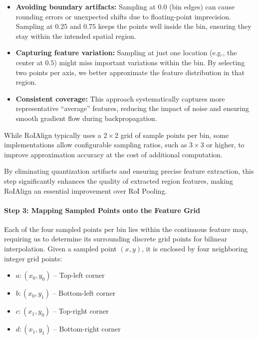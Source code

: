 \begin{itemize}
    \item \textbf{Avoiding boundary artifacts:} Sampling at \(0.0\) (bin edges) can cause rounding errors or unexpected shifts due to floating-point imprecision. Sampling at \(0.25\) and \(0.75\) keeps the points well inside the bin, ensuring they stay within the intended spatial region.
    
    \item \textbf{Capturing feature variation:} Sampling at just one location (e.g., the center at \(0.5\)) might miss important variations within the bin. By selecting two points per axis, we better approximate the feature distribution in that region.
    
    \item \textbf{Consistent coverage:} This approach systematically captures more representative “average” features, reducing the impact of noise and ensuring smooth gradient flow during backpropagation.
\end{itemize}

While RoIAlign typically uses a \(2 \times 2\) grid of sample points per bin, some implementations allow configurable sampling ratios, such as \(3 \times 3\) or higher, to improve approximation accuracy at the cost of additional computation.

By eliminating quantization artifacts and ensuring precise feature extraction, this step significantly enhances the quality of extracted region features, making RoIAlign an essential improvement over RoI Pooling.

\paragraph{Step 3: Mapping Sampled Points onto the Feature Grid}
Each of the four sampled points per bin lies within the continuous feature map, requiring us to determine its surrounding discrete grid points for bilinear interpolation. Given a sampled point \((x, y)\), it is enclosed by four neighboring integer grid points:

\begin{itemize}
    \item \( a: (x_0, y_0) \) – Top-left corner
    \item \( b: (x_0, y_1) \) – Bottom-left corner
    \item \( c: (x_1, y_0) \) – Top-right corner
    \item \( d: (x_1, y_1) \) – Bottom-right corner
\end{itemize}

